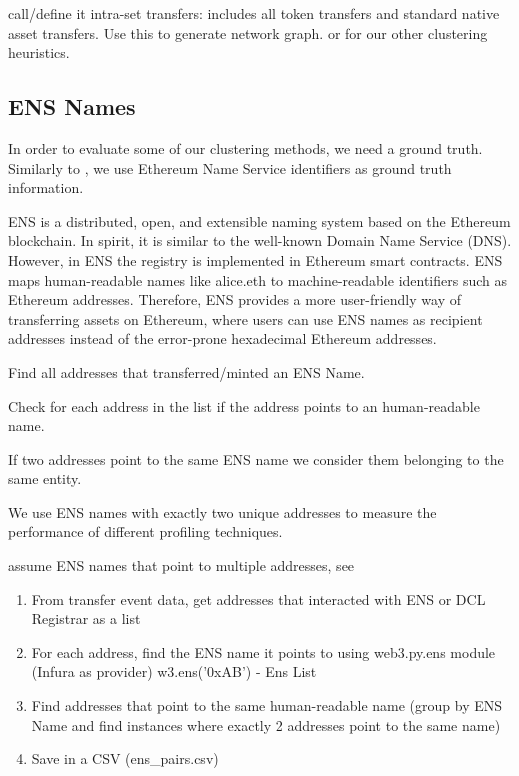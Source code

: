 \documentclass[12pt,a4paper,titlepage,oneside,english]{article}
\begin{document}
call/define it intra-set transfers: includes all token transfers and standard native asset transfers. Use this to generate network graph. or for our other clustering heuristics.

\subsection{ENS Names}
In order to evaluate some of our clustering methods, we need a ground truth. Similarly to \cite{Beres2020}, we use Ethereum Name Service identifiers as ground truth information.

ENS is a distributed, open, and extensible naming system based on the Ethereum blockchain. In spirit, it is similar to the well-known Domain Name Service (DNS). However, in ENS the registry is implemented in Ethereum smart contracts. ENS maps human-readable names like alice.eth to machine-readable identifiers such as Ethereum addresses. Therefore, ENS provides a more user-friendly way of transferring assets on Ethereum, where users can use ENS names as recipient addresses instead of the error-prone hexadecimal Ethereum addresses.




Find all addresses that transferred/minted an ENS Name.

Check for each address in the list if the address points to an human-readable name.

If two addresses point to the same ENS name we consider them belonging to the same entity. 

We use ENS names with exactly two unique addresses to measure the performance of different profiling techniques.

assume ENS names that point to multiple addresses, see 


\begin{enumerate}
	\item From transfer event data, get addresses that interacted with ENS or DCL Registrar as a list
	\item For each address, find the ENS name it points to using web3.py.ens module (Infura as provider) w3.ens('0xAB') - Ens List
	\item Find addresses that point to the same human-readable name (group by ENS Name and find instances where exactly 2 addresses point to the same name)
	\item Save in a CSV (ens\_pairs.csv)
\end{enumerate}
 
\end{document}
